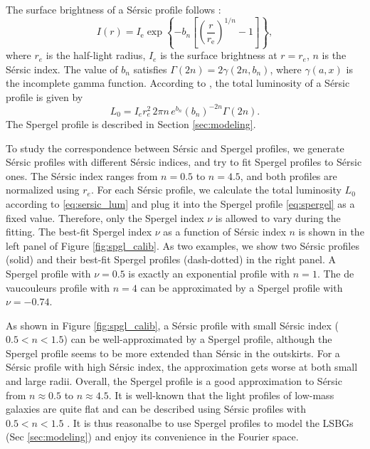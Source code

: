 \documentclass[twocolumn,astrosymb,twocolappendix]{aastex631}
\newcommand{\sersic}{S\'ersic}
\begin{document}
\begin{CJK*}{UTF8}{gbsn}
The surface brightness of a \sersic{} profile follows \citep{Sersic1963,Graham2005}:
\begin{equation}\label{eq:sersic}
    I(r)=I_{\mathrm{e}} \exp \left\{-b_{n}\left[\left(\frac{r}{r_{\mathrm{e}}}\right)^{1 / n}-1\right]\right\},
\end{equation}
where $r_e$ is the half-light radius, $I_e$ is the surface brightness at $r=r_e$, $n$ is the \sersic{} index. The value of $b_n$ satisfies $\Gamma(2 n)=2 \gamma\left(2 n, b_{n}\right)$, where $\gamma(a, x)$ is the incomplete gamma function. According to \citet{Graham2005}, the total luminosity of a \sersic{} profile is given by 
\begin{equation}\label{eq:sersic_lum}
    L_0 = I_{e} r_{e}^{2}\, 2 \pi n\, e^{b_{n}} \left(b_{n}\right)^{-2 n} \Gamma(2 n).
\end{equation}
The Spergel profile is described in Section \ref{sec:modeling}. 

To study the correspondence between \sersic{} and Spergel profiles, we generate \sersic{} profiles with different \sersic{} indices, and try to fit Spergel profiles to \sersic{} ones. The \sersic{} index ranges from $n=0.5$ to $n=4.5$, and both profiles are normalized using $r_e$. For each \sersic{} profile, we calculate the total luminosity $L_0$ according to \eqref{eq:sersic_lum} and plug it into the Spergel profile \eqref{eq:spergel} as a fixed value. Therefore, only the Spergel index $\nu$ is allowed to vary during the fitting. The best-fit Spergel index $\nu$ as a function of \sersic{} index $n$ is shown in the left panel of Figure \ref{fig:spgl_calib}. As two examples, we show two \sersic{} profiles (solid) and their best-fit Spergel profiles (dash-dotted) in the right panel. A Spergel profile with $\nu=0.5$ is exactly an exponential profile with $n=1$. The de vaucouleurs profile \citep{deVaucouleurs1948} with $n=4$ can be approximated by a Spergel profile with $\nu=-0.74$. 

As shown in Figure \ref{fig:spgl_calib}, a \sersic{} profile with small \sersic{} index ($0.5 < n < 1.5$) can be well-approximated by a Spergel profile, although the Spergel profile seems to be more extended than \sersic{} in the outskirts. For a \sersic{} profile with high \sersic{} index, the approximation gets worse at both small and large radii. Overall, the Spergel profile is a good approximation to \sersic{} from $n\approx 0.5$ to $n\approx 4.5$. It is well-known that the light profiles of low-mass galaxies are quite flat and can be described using \sersic{} profiles with $0.5 < n < 1.5$ \citep[e.g.,][]{Lange2015,Greco2018,ELVES-I}. It is thus reasonalbe to use Spergel profiles to model the LSBGs (Sec \ref{sec:modeling}) and enjoy its convenience in the Fourier space. 


\end{CJK*}
\end{document}
